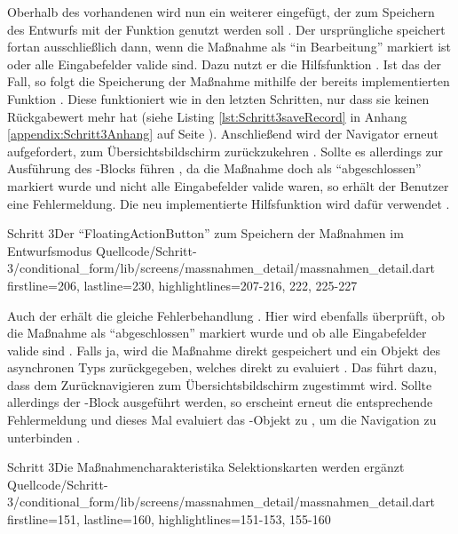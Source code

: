 Oberhalb des vorhandenen  wird nun ein weiterer eingefügt, der zum Speichern des Entwurfs mit der Funktion  genutzt werden soll .
Der ursprüngliche  speichert fortan ausschließlich dann, wenn die Maßnahme als \enquote{in Bearbeitung} markiert ist oder alle Eingabefelder valide sind.
Dazu nutzt er die Hilfsfunktion  .
Ist das der Fall, so folgt die Speicherung der Maßnahme mithilfe der bereits implementierten Funktion  .
Diese funktioniert wie in den letzten Schritten, nur dass sie keinen Rückgabewert mehr hat (siehe Listing \ref{lst:Schritt3saveRecord} in Anhang \ref{appendix:Schritt3Anhang} auf Seite \pageref{appendix:Schritt3Anhang}).
Anschließend wird der Navigator erneut aufgefordert, zum Übersichtsbildschirm zurückzukehren .
Sollte es allerdings zur Ausführung des -Blocks führen ,
da die Maßnahme doch als \enquote{abgeschlossen} markiert wurde und nicht alle Eingabefelder valide waren,
so erhält der Benutzer eine Fehlermeldung. Die neu implementierte Hilfsfunktion  wird dafür verwendet . 
   
\begin{alexlisting}{Schritt 3}{Der \enquote{FloatingActionButton} zum Speichern der Maßnahmen im Entwurfsmodus}
    {Quellcode/Schritt-3/conditional_form/lib/screens/massnahmen_detail/massnahmen_detail.dart}
    {firstline=206, lastline=230, highlightlines={207-216, 222, 225-227}}
    \label{lst:Schritt3FloatingActionButton}
\end{alexlisting} 

Auch der  erhält die gleiche Fehlerbehandlung \Lst{\ref{lst:Schritt3onWillPop}}.
Hier wird ebenfalls überprüft, ob die Maßnahme als \enquote{abgeschlossen} markiert wurde und ob alle Eingabefelder valide sind .
Falls ja, wird die Maßnahme direkt gespeichert und ein Objekt des asynchronen Typs  zurückgegeben, welches direkt zu  evaluiert .
Das führt dazu, dass dem Zurücknavigieren zum Übersichtsbildschirm zugestimmt wird.
Sollte allerdings der -Block ausgeführt werden, so erscheint erneut die entsprechende Fehlermeldung  und dieses Mal evaluiert das -Objekt zu , um die Navigation zu unterbinden .

\begin{alexlisting}{Schritt 3}{Die Maßnahmencharakteristika Selektionskarten werden ergänzt}
    {Quellcode/Schritt-3/conditional_form/lib/screens/massnahmen_detail/massnahmen_detail.dart}
    {firstline=151, lastline=160, highlightlines={151-153, 155-160}}
    \label{lst:Schritt3onWillPop}
\end{alexlisting}

